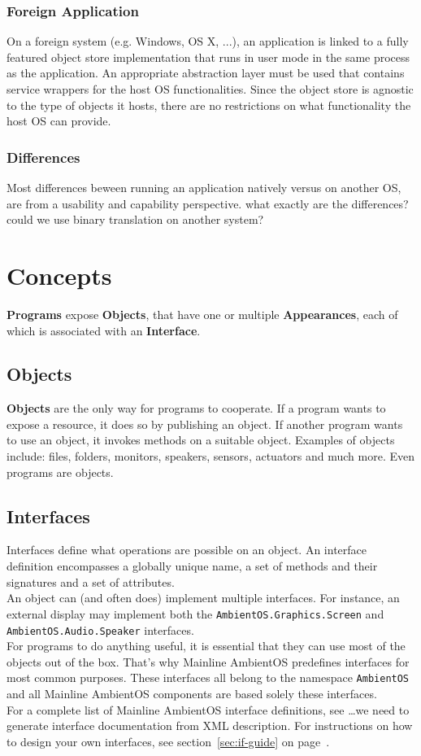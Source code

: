 \documentclass[a4paper]{article}
\begin{document}
\subsubsection{Foreign Application}
On a foreign system (e.g. Windows, OS X, ...), an application is linked to a fully featured object store implementation that runs in user mode in the same process as the application. An appropriate abstraction layer must be used that contains service wrappers for the host OS functionalities. Since the object store is agnostic to the type of objects it hosts, there are no restrictions on what functionality the host OS can provide.

\subsubsection{Differences}
Most differences beween running an application natively versus on another OS, are from a usability and capability perspective. {\q what exactly are the differences? could we use binary translation on another system?}


\section{Concepts}
{\bf Programs} expose {\bf Objects}, that have one or multiple {\bf Appearances}, each of which is associated with an {\bf Interface}.

\subsection{Objects}
{\bf Objects} are the only way for programs to cooperate.
If a program wants to expose a resource, it does so by publishing an object. If another program wants to use an object, it invokes methods on a suitable object.
Examples of objects include: files, folders, monitors, speakers, sensors, actuators and much more. Even programs are objects.

\subsection{Interfaces}
Interfaces define what operations are possible on an object. An interface definition encompasses a globally unique name, a set of methods and their signatures and a set of attributes. \\
An object can (and often does) implement multiple interfaces. For instance, an external display may implement both the {\tt AmbientOS.Graphics.Screen} and {\tt AmbientOS.Audio.Speaker} interfaces. \\
For programs to do anything useful, it is essential that they can use most of the objects out of the box. That's why Mainline AmbientOS predefines interfaces for most common purposes. These interfaces all belong to the namespace {\tt AmbientOS} and all Mainline AmbientOS components are based solely these interfaces. \\
For a complete list of Mainline AmbientOS interface definitions, see {\q \ldots we need to generate interface documentation from XML description}. For instructions on how to design your own interfaces, see section~\ref{sec:if-guide} on page~\pageref{sec:if-guide}.
\end{document}
